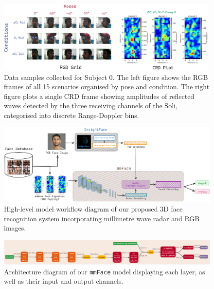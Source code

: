 \documentclass{mpaper}
\begin{document}
\begin{figure}[h!]
    \centering
    \vspace{-1.1cm}
    \includegraphics[width=0.99\textwidth]{figures/rgb_crd_plot.png}
    \vspace{0.2cm}
    \caption{Data samples collected for Subject 0. The left figure shows the RGB frames of all 15 scenarios organised by pose and condition. The right figure plots a single CRD frame showing amplitudes of reflected waves detected by the three receiving channels of the Soli, categorised into discrete Range-Doppler bins.}
    \label{fig:rgb_crd_plot}
\end{figure}

\begin{figure}[t]
    \centering
    \includegraphics[width=1\textwidth]{figures/model_workflow.png}
    \vspace{0.001cm}
    \caption{High-level model workflow diagram of our proposed 3D face recognition system incorporating millimetre wave radar and RGB images.}
    \label{fig:model_workflow}
    \vspace{0.1cm}
\end{figure}

\begin{figure}[h!]
    \centering
    \includegraphics[width=1.02\textwidth]{figures/model_architecture.png}
    \vspace{0.001cm}
    \caption{Architecture diagram of our \texttt{mmFace} model displaying each layer, as well as their input and output channels.}
    \label{fig:model_architecture}
    \vspace{-0.2cm}
\end{figure}
\end{document}
